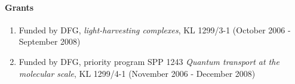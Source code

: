 \paragraph{Grants}
\begin{enumerate}
\item Funded by DFG, \emph{light-harvesting complexes}, KL
  1299/3-1 (October 2006 - September 2008)
\item Funded by DFG, priority program SPP 1243 \emph{Quantum transport
  at the molecular scale}, KL 1299/4-1 (November 2006 - December
  2008)
\end{enumerate}
\newpage

\nocite{profkleinekathoeferwela05a}
\nocite{profkleinekathoeferschr05a}
\nocite{profkleinekathoeferwela05b}
\nocite{profkleinekathoeferklei06a}
\nocite{profkleinekathoeferklei06b}
\nocite{profkleinekathoeferklei06c}
